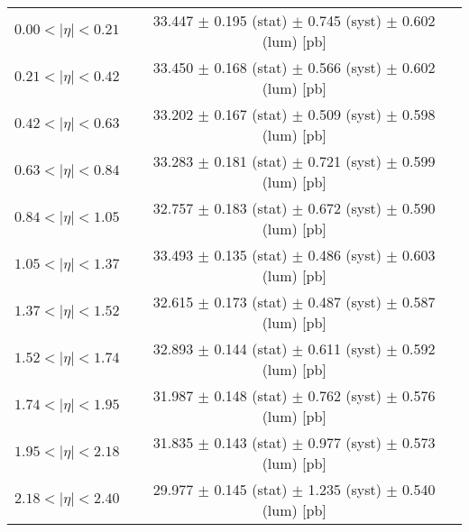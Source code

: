 \begin{tabular}{lc}
\hline
$0.00 < |\eta| <0.21$          & 33.447 $\pm$ 0.195 (stat) $\pm$ 0.745 (syst) $\pm$ 0.602 (lum) [pb]  \\
$0.21 < |\eta| <0.42$          & 33.450 $\pm$ 0.168 (stat) $\pm$ 0.566 (syst) $\pm$ 0.602 (lum) [pb]  \\
$0.42 < |\eta| <0.63$          & 33.202 $\pm$ 0.167 (stat) $\pm$ 0.509 (syst) $\pm$ 0.598 (lum) [pb]  \\
$0.63 < |\eta| <0.84$          & 33.283 $\pm$ 0.181 (stat) $\pm$ 0.721 (syst) $\pm$ 0.599 (lum) [pb]  \\
$0.84 < |\eta| <1.05$          & 32.757 $\pm$ 0.183 (stat) $\pm$ 0.672 (syst) $\pm$ 0.590 (lum) [pb]  \\
$1.05 < |\eta| <1.37$          & 33.493 $\pm$ 0.135 (stat) $\pm$ 0.486 (syst) $\pm$ 0.603 (lum) [pb]  \\
$1.37 < |\eta| <1.52$          & 32.615 $\pm$ 0.173 (stat) $\pm$ 0.487 (syst) $\pm$ 0.587 (lum) [pb]  \\
$1.52 < |\eta| <1.74$          & 32.893 $\pm$ 0.144 (stat) $\pm$ 0.611 (syst) $\pm$ 0.592 (lum) [pb]  \\
$1.74 < |\eta| <1.95$          & 31.987 $\pm$ 0.148 (stat) $\pm$ 0.762 (syst) $\pm$ 0.576 (lum) [pb]  \\
$1.95 < |\eta| <2.18$          & 31.835 $\pm$ 0.143 (stat) $\pm$ 0.977 (syst) $\pm$ 0.573 (lum) [pb]  \\
$2.18 < |\eta| <2.40$          & 29.977 $\pm$ 0.145 (stat) $\pm$ 1.235 (syst) $\pm$ 0.540 (lum) [pb]  \\
\hline
\end{tabular}
